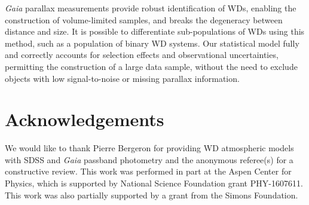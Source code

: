 \documentclass[fleqn,usenatbib]{mnras}
\begin{document}
\emph{Gaia} parallax measurements provide robust identification of WDs, enabling the construction of volume-limited samples, and breaks the degeneracy between distance and size. It is possible to differentiate sub-populations of WDs using this method, such as a population of binary WD systems. Our statistical model fully and correctly accounts for selection effects and observational uncertainties, permitting the construction of a large data sample, without the need to exclude objects with low signal-to-noise or missing parallax information.



\section*{Acknowledgements}

We would like to thank Pierre Bergeron for providing WD atmospheric models with SDSS and \emph{Gaia} passband photometry and the anonymous referee(s) for a constructive review. This work was performed in part at the Aspen Center for Physics, which is supported by National Science Foundation grant PHY-1607611. This work was also partially supported by a grant from the Simons Foundation.











\bsp	%
\label{lastpage}
\end{document}
